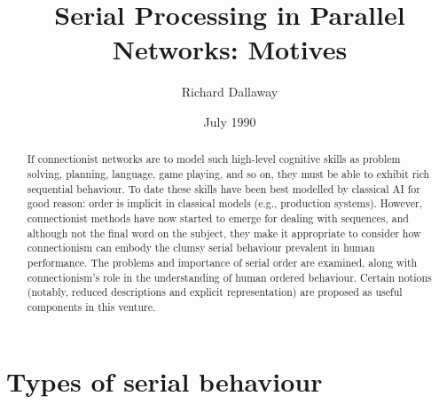 
\setcounter{page}{30}

\author{Richard Dallaway}
\title{Serial Processing in Parallel Networks: Motives}
\date{July 1990}
\maketitle

\def\bssq{\begin{quote}\small}
\def\essq{\def\baselinestretch{1}\small\normalsize\end{quote}}
\def\headpar#1{\medskip\noindent{\em#1}}
\def\sec#1{\section{#1}}
\def\subsec#1{\subsection{#1}}
\def\subsubsec#1{\subsubsection{#1}}
\citepunct{[}{and}{ }{; }{, }{]}
\def\citeA{\shortcite}
\def\citeA{\shortciteA}

\begin{abstract}
If connectionist networks are to model such high-level cognitive
skills as problem solving, planning, language, game playing, and so
on, they must be able to exhibit rich sequential behaviour. To date
these skills have been best modelled by classical AI for good
reason: order is implicit in classical models (e.g., production
systems). However, connectionist methods have now started to emerge
for dealing with sequences, and although not the final word on the
subject, they make it appropriate to consider how connectionism can
embody the clumsy serial behaviour prevalent in human performance. The
problems and importance of serial order are examined, along with
connectionism's role in the understanding of human ordered behaviour.
Certain notions (notably, reduced descriptions and explicit
representation) are proposed as useful components in this venture.
\end{abstract}

\sec{Types of serial behaviour}

